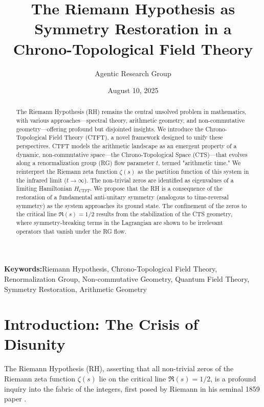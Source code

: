 \documentclass[11pt, a4paper]{article}
\title{The Riemann Hypothesis as Symmetry Restoration in a Chrono-Topological Field Theory}
\author{Agentic Research Group}
\date{August 10, 2025}
\theoremstyle{definition}
\newcommand{\keywords}[1]{\par\addvspace\baselineskip\noindent\textbf{Keywords:}\enspace\ignorespaces#1}
\begin{document}
\maketitle

\begin{abstract}
The Riemann Hypothesis (RH) remains the central unsolved problem in mathematics, with various approaches—spectral theory, arithmetic geometry, and non-commutative geometry—offering profound but disjointed insights. We introduce the Chrono-Topological Field Theory (CTFT), a novel framework designed to unify these perspectives. CTFT models the arithmetic landscape as an emergent property of a dynamic, non-commutative space—the Chrono-Topological Space (CTS)—that evolves along a renormalization group (RG) flow parameter $t$, termed "arithmetic time." We reinterpret the Riemann zeta function $\zeta(s)$ as the partition function of this system in the infrared limit ($t\to\infty$). The non-trivial zeros are identified as eigenvalues of a limiting Hamiltonian $H_{CTFT}$. We propose that the RH is a consequence of the restoration of a fundamental anti-unitary symmetry (analogous to time-reversal symmetry) as the system approaches its ground state. The confinement of the zeros to the critical line $\Re(s) = 1/2$ results from the stabilization of the CTS geometry, where symmetry-breaking terms in the Lagrangian are shown to be irrelevant operators that vanish under the RG flow.
\end{abstract}

\keywords{Riemann Hypothesis, Chrono-Topological Field Theory, Renormalization Group, Non-commutative Geometry, Quantum Field Theory, Symmetry Restoration, Arithmetic Geometry}

\tableofcontents

\section{Introduction: The Crisis of Disunity}
The Riemann Hypothesis (RH), asserting that all non-trivial zeros of the Riemann zeta function $\zeta(s)$ lie on the critical line $\Re(s) = 1/2$, is a profound inquiry into the fabric of the integers, first posed by Riemann in his seminal 1859 paper \cite{Riemann1859}.
\end{document}
